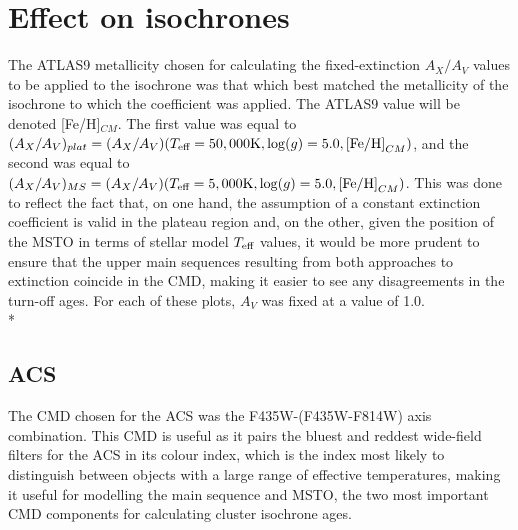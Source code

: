 \documentclass[12pt, a4paper]{report}
\begin{document}
\section{Effect on isochrones} \label{result_CMDs}
The ATLAS9 metallicity chosen for calculating the fixed-extinction $A_{X}/A_{V}$ values to be applied to the isochrone was that which best matched the metallicity of the isochrone to which the coefficient was applied. The ATLAS9 value will be denoted [Fe/H]$_{CM}$. The first value was equal to $(A_{X}/A_{V})_{plat} = (A_{X}/A_{V})(T_{\textnormal{eff}} = 50,000\textnormal{K},\log(g) = 5.0,\textnormal{[Fe/H]}_{CM})$, and the second was equal to $(A_{X}/A_{V})_{MS} = (A_{X}/A_{V})(T_{\textnormal{eff}} = 5,000\textnormal{K},\log(g) = 5.0,\textnormal{[Fe/H]}_{CM})$. This was done to reflect the fact that, on one hand, the assumption of a constant extinction coefficient is valid in the plateau region and, on the other, given the position of the MSTO in terms of stellar model $T_{\textnormal{eff}}$ values, it would be more prudent to ensure that the upper main sequences resulting from both approaches to extinction coincide in the CMD, making it easier to see any disagreements in the turn-off ages. For each of these plots, $A_{V}$ was fixed at a value of 1.0.\\*

\subsection{ACS} \label{ACS_isoc}
The CMD chosen for the ACS was the F435W-(F435W-F814W) axis combination. This CMD is useful as it pairs the bluest and reddest wide-field filters for the ACS in its colour index, which is the index most likely to distinguish between objects with a large range of effective temperatures, making it useful for modelling the main sequence and MSTO, the two most important CMD components for calculating cluster isochrone ages.
\end{document}
